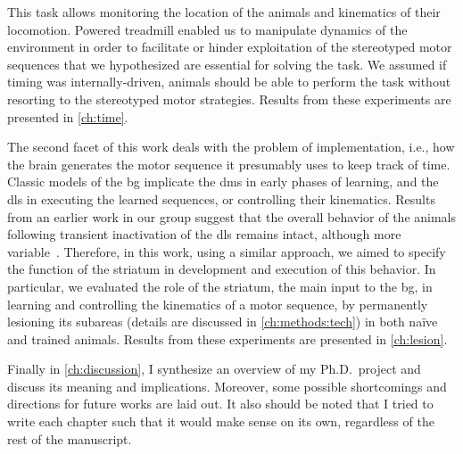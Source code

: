 This task allows monitoring the location of the animals and kinematics of their locomotion.
Powered treadmill enabled us to manipulate dynamics of the environment in order to facilitate or hinder exploitation of the stereotyped motor sequences that we hypothesized are essential for solving the task.
We assumed if timing was internally-driven, animals should be able to perform the task without resorting to the stereotyped motor strategies.
Results from these experiments are presented in \autoref{ch:time}.
\par
The second facet of this work deals with the problem of implementation, i.e., how the brain generates the motor 
sequence it presumably uses to keep track of time.
Classic models of the \gls{bg} implicate the \gls{dms} in early phases of learning, and the \gls{dls} in executing the learned sequences, or controlling their kinematics.
Results from an earlier work in our group suggest that the overall behavior of the animals following transient inactivation of the \gls{dls} remains intact, although more variable~\cite{Rueda2015NN}.
Therefore, in this work, using a similar approach, we aimed to specify the function of the striatum in development and execution of this behavior.
In particular, we evaluated the role of the striatum, the main input to the \gls{bg}, in learning and controlling the kinematics of a motor sequence, by permanently lesioning its subareas (details are discussed in \autoref{ch:methods:tech}) in both na\"{i}ve and trained animals.
Results from these experiments are presented in \autoref{ch:lesion}.
\par
Finally in \autoref{ch:discussion}, I synthesize an overview of my Ph.D.\ project and discuss its meaning and implications.
Moreover, some possible shortcomings and directions for future works are laid out.
It also should be noted that I tried to write each chapter such that it would make sense on its own, regardless of the rest of the manuscript.